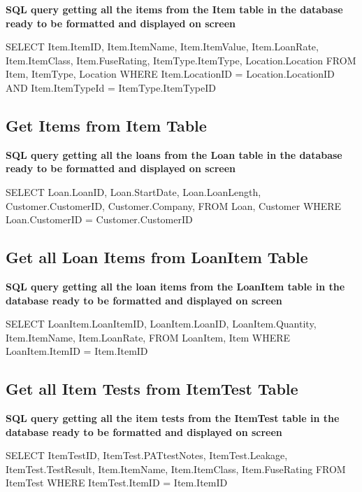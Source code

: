 \textbf{SQL query getting all the items from the Item table in the database ready to be formatted and displayed on screen}

\begin{sql}
      SELECT
      Item.ItemID,
      Item.ItemName,
      Item.ItemValue,
      Item.LoanRate,
      Item.ItemClass,
      Item.FuseRating,
      ItemType.ItemType,
      Location.Location
      FROM Item, ItemType, Location
      WHERE Item.LocationID = Location.LocationID AND Item.ItemTypeId = ItemType.ItemTypeID
\end{sql}

\subsection{Get Items from Item Table}

\textbf{SQL query getting all the loans from the Loan table in the database ready to be formatted and displayed on screen}

\begin{sql}
    SELECT
    Loan.LoanID,
    Loan.StartDate,
    Loan.LoanLength,
    Customer.CustomerID,
    Customer.Company,
    FROM Loan, Customer
    WHERE Loan.CustomerID = Customer.CustomerID
\end{sql}

\newpage

\subsection{Get all Loan Items from LoanItem Table}

\textbf{SQL query getting all the loan items from the LoanItem table in the database ready to be formatted and displayed on screen}

\begin{sql}
    SELECT
    LoanItem.LoanItemID,
    LoanItem.LoanID,
    LoanItem.Quantity,
    Item.ItemName,
    Item.LoanRate,
    FROM LoanItem, Item
    WHERE LoanItem.ItemID = Item.ItemID
\end{sql}

\subsection{Get all Item Tests from ItemTest Table}

\textbf{SQL query getting all the item tests from the ItemTest table in the database ready to be formatted and displayed on screen}

\begin{sql}
      SELECT
      ItemTestID, 
      ItemTest.PATtestNotes,
      ItemTest.Leakage,
      ItemTest.TestResult,
      Item.ItemName,
      Item.ItemClass,
      Item.FuseRating
      FROM ItemTest
      WHERE ItemTest.ItemID = Item.ItemID
\end{sql}

